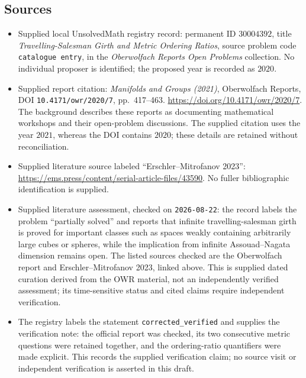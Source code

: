 \documentclass[11pt]{article}
\begin{document}
\subsection{Sources}
\begin{itemize}
\item Supplied local UnsolvedMath registry record: permanent ID \(30004392\), title \emph{Travelling-Salesman Girth and Metric Ordering Ratios}, source problem code \texttt{catalogue entry}, in the \emph{Oberwolfach Reports Open Problems} collection. No individual proposer is identified; the proposed year is recorded as \(2020\).
\item Supplied report citation: \emph{Manifolds and Groups (2021)}, Oberwolfach Reports, DOI \texttt{10.4171/owr/2020/7}, pp.~417--463. \url{https://doi.org/10.4171/owr/2020/7}. The background describes these reports as documenting mathematical workshops and their open-problem discussions. The supplied citation uses the year \(2021\), whereas the DOI contains \(2020\); these details are retained without reconciliation.
\item Supplied literature source labeled ``Erschler--Mitrofanov 2023'': \url{https://ems.press/content/serial-article-files/43590}. No fuller bibliographic identification is supplied.
\item Supplied literature assessment, checked on \texttt{2026-08-22}: the record labels the problem ``partially solved'' and reports that infinite travelling-salesman girth is proved for important classes such as spaces weakly containing arbitrarily large cubes or spheres, while the implication from infinite Assouad--Nagata dimension remains open. The listed sources checked are the Oberwolfach report and Erschler--Mitrofanov 2023, linked above. This is supplied dated curation derived from the OWR material, not an independently verified assessment; its time-sensitive status and cited claims require independent verification.
\item The registry labels the statement \texttt{corrected\_verified} and supplies the verification note: the official report was checked, its two consecutive metric questions were retained together, and the ordering-ratio quantifiers were made explicit. This records the supplied verification claim; no source visit or independent verification is asserted in this draft.
\end{itemize}
\end{document}
